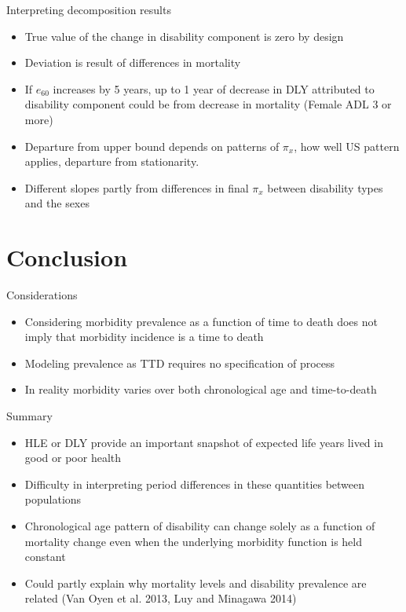 \documentclass[20pt]{beamer}
\begin{document}
\begin{frame}{Interpreting decomposition results}
\begin{itemize}[<+>]
\item True value of the change in disability component is zero by design
\item Deviation is result of differences in mortality
\item If $e_{60}$ increases by 5 years, up to 1 year of decrease in DLY attributed to disability component could be from decrease in mortality (Female ADL 3 or more)
\item Departure from upper bound depends on patterns of $\pi_x$, how well US
pattern applies, departure from stationarity.
\item Different slopes partly from differences in final $\pi_x$ between
disability types and the sexes
\end{itemize}
\end{frame}

\section{Conclusion}

\begin{frame}{Considerations}
\begin{itemize}[<+>]
\item Considering morbidity prevalence as a function of time to death does not imply that morbidity incidence is a time to death
\item Modeling prevalence as TTD requires no specification of process
\item In reality morbidity varies over both chronological age and time-to-death
\end{itemize}
\end{frame}
\begin{frame}{Summary}
\begin{itemize}[<+>]
\item HLE or DLY provide an important snapshot of expected life years lived in good or poor health
\item Difficulty in interpreting period differences in these quantities between populations 
\item Chronological age pattern of disability can change solely as a function of mortality change even when the underlying morbidity function is held constant
\item Could partly explain why mortality levels and disability prevalence are related (Van Oyen et al. 2013, Luy and Minagawa 2014)
\end{itemize}
\end{frame}
\end{document}
